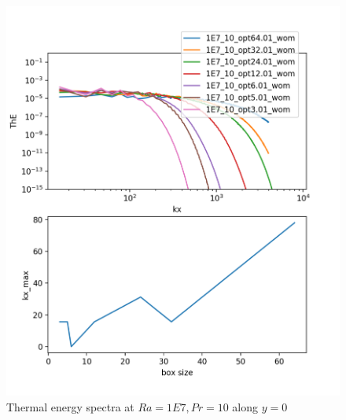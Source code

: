 \documentclass[12pt]{article}
\begin{document}
      \begin{figure}[!htb]
      	\includegraphics[width=\linewidth]{ThE_1E7_10.png}
      	\caption{ Thermal energy spectra at $Ra = 1E7, Pr =10$ along $y = 0$}
      	\label{fig:fig25}
      \end{figure}
      
\end{document}
